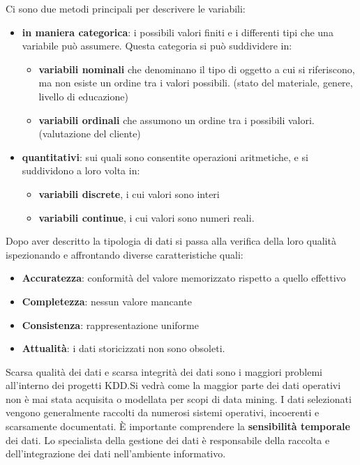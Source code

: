 \documentclass[a4paper]{extarticle}
\begin{document}
Ci sono due metodi principali per descrivere le variabili:
\begin{itemize}
\item \textbf{in maniera categorica}: i possibili valori finiti e i differenti tipi che una variabile può assumere. Questa categoria si può suddividere in:
\begin{itemize}
\item \textbf{variabili nominali} che denominano il tipo di oggetto a cui si riferiscono, ma non esiste un ordine tra i valori possibili. (stato del materiale, genere, livello di educazione)
\item \textbf{variabili ordinali} che assumono un ordine tra i possibili valori. (valutazione del cliente)
\end{itemize}

\item \textbf{quantitativi}: sui quali sono consentite operazioni aritmetiche, e si suddividono a loro volta in:
\begin{itemize}
\item \textbf{variabili discrete}, i cui valori sono interi
\item \textbf{variabili continue}, i cui valori sono numeri reali.
\end{itemize}
\end{itemize}

Dopo aver descritto la tipologia di dati si passa alla verifica della loro qualità ispezionando e affrontando diverse caratteristiche quali:
\begin{itemize}
\item \textbf{Accuratezza}: conformità del valore memorizzato rispetto a quello effettivo
\item \textbf{Completezza}: nessun valore mancante
\item \textbf{Consistenza}: rappresentazione uniforme
\item \textbf{Attualità}: i dati storicizzati non sono obsoleti.
\end{itemize}
Scarsa qualità dei dati e scarsa integrità dei dati sono i maggiori problemi all'interno dei progetti KDD.Si vedrà come la maggior parte dei dati operativi non è mai stata acquisita o modellata per scopi di data mining. I dati selezionati vengono generalmente raccolti da numerosi sistemi operativi, incoerenti e scarsamente documentati. È importante comprendere la \textbf{sensibilità temporale} dei dati. Lo specialista della gestione dei dati è responsabile della raccolta e dell'integrazione dei dati nell'ambiente informativo. 
\end{document}
